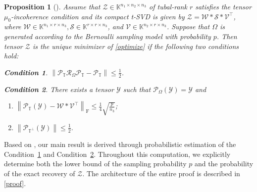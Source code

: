\documentclass[twoside,12pt]{article}
\newtheorem{condition}{Condition}
\newtheorem{proposition}{Proposition}
\def\fro{{\mathrm{F}}}
\def\fro{{\mathrm{F}}}
\begin{document}
\begin{proposition}[\cite{Lu18}] \label{conditions} Assume that $\mathcal{Z}\in\mathbb{K}^{n_1 \times n_2 \times n_3}$ of tubal-rank $r$ satisfies the tensor $\mu_0$-incoherence condition and its compact t-SVD is given by $\mathcal{Z}=\mathcal{W} * \mathcal{S} * \mathcal{V}^{\top}$, where $\mathcal{W} \in \mathbb{K}^{n_1 \times r \times n_3}, \mathcal{S}\in \mathbb{K}^{r \times r \times n_3}$, and $\mathcal{V} \in \mathbb{K}^{n_2 \times r \times n_3}$. Suppose that $\Omega$ is generated according to the Bernoulli sampling model with probability $p$. 
Then tensor $\mathcal{Z}$ is the unique minimizer of  \eqref{optimize} if the following two conditions hold:
\begin{condition}
    \label{CondI}  $\left\|\mathcal{P}_{\mathbb{T}}\mathcal{R}_{\Omega}\mathcal{P}_{\mathbb{T}}-\mathcal{P}_{\mathbb{T}}\right\| \leq \frac{1}{2}$.
\end{condition}
\begin{condition}
    \label{CondII}  There exists a tensor $\mathcal{Y}$ such that $\mathcal{P}_{\Omega}(\mathcal{Y})=\mathcal{Y}$ and
\begin{enumerate}[ leftmargin=.5in]
    \item[(a)] $\left\|\mathcal{P}_{\mathbb{T}}(\mathcal{Y})-\mathcal{W}*\mathcal{V}^{\top}\right\|_{\fro} \leq \frac{1}{4}\sqrt{\frac{p}{n_3}}$;
    \item[(b)] $\left\|\mathcal{P}_{\mathbb{T}^{\perp}}(\mathcal{Y})\right\|\leq \frac{1}{2}$.
\end{enumerate}
\end{condition}
\end{proposition}
Based on  , our main result is derived through probabilistic estimation of the Condition~\ref{CondI} and Condition~\ref{CondII}. Throughout this computation, we explicitly determine both the lower bound of the sampling probability
$p$ and the  probability of the exact recovery of  
$\mathcal{Z}$. The architecture of the entire proof is described in \ref{proof}. 
\end{document}
